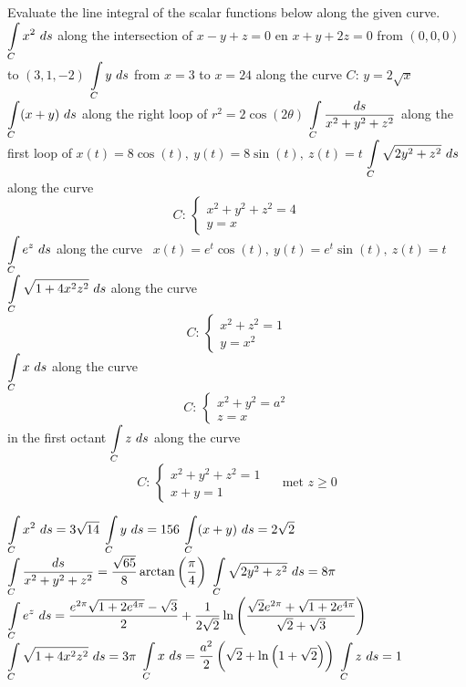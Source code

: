 \subsection*{}
\begin{Exercise} Evaluate the line integral of the scalar functions below along the given curve. 
    \Question[difficulty = 2] $\ds \int\limits_C x^2 \ ds$ \quad along the intersection of $x-y+z=0$ en $x+y+2z=0$ from $(0,0,0)$ to $(3,1,-2)$ 
    \Question[difficulty = 1] $\displaystyle \int\limits_C y \ ds$ \quad from $x=3$ to $x=24$ along the curve $C: \, y=2\sqrt{x}$
    \Question[difficulty = 3] $\displaystyle \int\limits_C (x+y) \ ds$ \quad along the right loop of $r^2 = 2 \cos (2 \theta)$
    \Question[difficulty = 3] $\displaystyle \int\limits_C \dfrac{ds}{x^2 + y^2 + z^2}$ \quad along the first loop of $x(t) = 8 \cos (t),\  y(t) = 8 \sin(t),\  z(t) = t$
    \Question[difficulty = 3] $\ds \int\limits_C \sqrt{2y^2 + z^2} \ ds$ \quad along the curve $$C: \,\left\{ \begin{array}{l}x^2+y^2+z^2 = 4 \\ y = x \end{array} \right.$$
    \Question[difficulty = 3] $\displaystyle \int\limits_C e^z \ ds$ \quad along the curve \  $x(t) = e^t \cos (t),\  y(t) = e^t \sin(t), \ z(t) = t$  
     \Question[difficulty = 3] $\ds \int\limits_C \sqrt{1+4x^2z^2} \ ds$ \quad along the curve $$C: \,\left\{ \begin{array}{l}x^2+z^2 = 1 \\ y = x^2 \end{array} \right.$$ 
     \Question[difficulty = 2] $\displaystyle \int\limits_C x \ ds$ \quad along the curve $$C: \,\left\{ \begin{array}{l}x^2+y^2 = a^2 \\ z=x \end{array} \right.$$ in the first octant 
     \Question[difficulty = 2] $\ds \int\limits_C z \ ds$ \quad along the curve $$C: \,\left\{ \begin{array}{l}x^2+y^2 +z^2= 1 \\ x+y=1 \end{array} \right.\quad \text{ met } z \geq 0$$  
\end{Exercise}

\begin{Answer}
    
    \Question $\displaystyle \int\limits_C x^2 \ ds = 3 \sqrt{14}$
    \Question $\displaystyle \int\limits_C y \ ds = 156$
    \Question $\displaystyle \int\limits_C (x+y) \ ds = 2 \sqrt{2}$
    \Question $\displaystyle \int\limits_C \dfrac{ds}{x^2 + y^2 + z^2} = \dfrac{\sqrt{65}}{8} \arctan\left(\dfrac{\pi}{4} \right)$
    \Question $\displaystyle \int\limits_C \sqrt{2y^2 + z^2} \ ds = 8\pi$
    \Question $\displaystyle \int\limits_C e^z \ ds = \dfrac{e^{2\pi}\sqrt{1+2e^{4\pi}} - \sqrt{3}}{2} + \dfrac{1}{2\sqrt{2}} \ln \left( \dfrac{\sqrt{2}e^{2\pi}+\sqrt{1+2e^{4\pi}}}{\sqrt{2}+\sqrt{3}} \right)$
    \Question $\displaystyle \int\limits_C \sqrt{1+4x^2z^2} \ ds = 3 \pi$
    \Question $\displaystyle \int\limits_C x \ ds = \dfrac{a^2}{2} \left( \sqrt{2} + \ln \left( 1 + \sqrt{2} \right) \right)$
    \Question $\displaystyle \int\limits_C z \ ds = 1$ 
    
\end{Answer}    


